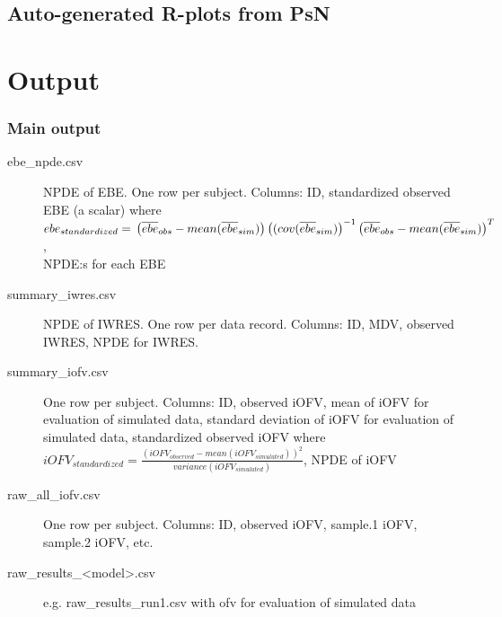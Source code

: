 \subsection{Auto-generated R-plots from PsN}
\newcommand{\rplotsconditions}{The default ebe\_npde template 
requires that library PerformanceAnalytics is installed.
If the conditions are not fulfilled then no pdf will be generated,
see the .Rout file in the main run directory for error messages.}



\section{Output}

\subsubsection*{Main output}
\begin{description}
\item[ebe\_npde.csv] NPDE of EBE. One row per subject. Columns: ID,
standardized observed EBE (a scalar) where 
$ebe_{standardized}= \\
\left(\overline{ebe}_{obs} - mean (\overline{ebe}_{sim})\right)\left((cov(\overline{ebe}_{sim})\right)^{-1}
\left(\overline{ebe}_{obs} - mean (\overline{ebe}_{sim})\right)^T$,\\ 
NPDE:s for each EBE
\item[summary\_iwres.csv] NPDE of IWRES. One row per data record. Columns: ID, MDV, observed IWRES, NPDE for IWRES.
\item[summary\_iofv.csv] One row per subject. Columns: ID, observed iOFV,
mean of iOFV for evaluation of simulated data,
standard deviation of iOFV for evaluation of simulated data,
standardized observed iOFV where
$iOFV_{standardized}=\frac{(iOFV_{observed} - mean (iOFV_{simulated}))^2}{variance(iOFV_{simulated})}$, NPDE of iOFV
\item[raw\_all\_iofv.csv] One row per subject. Columns: ID, observed iOFV, sample.1 iOFV, sample.2 iOFV, etc. 
\item[raw\_results\_<model>.csv] e.g. raw\_results\_run1.csv with ofv for evaluation of simulated data
\end{description}

